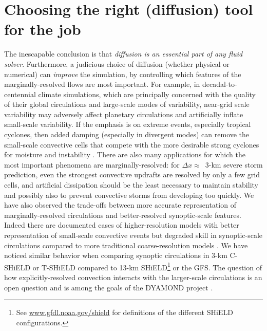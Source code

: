 \documentclass[10pt,letterpaper,margin=1in]{memoir}
\begin{document}
\section{Choosing the right (diffusion) tool for the job}

The inescapable conclusion is that \textit{diffusion is an essential part of any fluid solver}. Furthermore, a judicious choice of diffusion (whether physical or numerical) can \textit{improve} the simulation, by controlling which features of the marginally-resolved flows are most important. For example, in decadal-to-centennial climate simulations, which are principally concerned with the quality of their global circulations and large-scale modes of variability, near-grid scale variability may adversely affect planetary circulations and artificially inflate small-scale variability. If the emphasis is on extreme events, especially tropical cyclones, then added damping (especially in divergent modes) can remove the small-scale convective cells that compete with the more desirable strong cyclones for moisture and instability \citep{Zhao2012}. There are also many applications for which the most important phenomena are marginally-resolved:  for $\Delta x \approx$~3-km severe storm prediction, even the strongest convective updrafts are resolved by only a few grid cells, and artificial dissipation should be the least necessary to maintain stability and possibly also to prevent convective storms from developing too quickly. We have also observed the trade-offs between more accurate representation of marginally-resolved circulations and better-resolved synoptic-scale features. 
Indeed there are documented cases of higher-resolution models with better representation of small-scale convective events but degraded skill in synoptic-scale circulations compared to more traditional coarse-resolution models \citep{Schwartz2019,Dueben2020}. We have noticed similar behavior when comparing synoptic circulations in 3-km C-SHiELD or T-SHiELD compared to 13-km SHiELD\footnote{See \href{www.gfdl.noaa.gov/shield}{www.gfdl.noaa.gov/shield} for definitions of the different SHiELD configurations.} or the GFS. The question of how explicitly-resolved convection interacts with the larger-scale circulations is an open question and is among the goals of the DYAMOND project \citep{Stevens2019}. 
\end{document}
